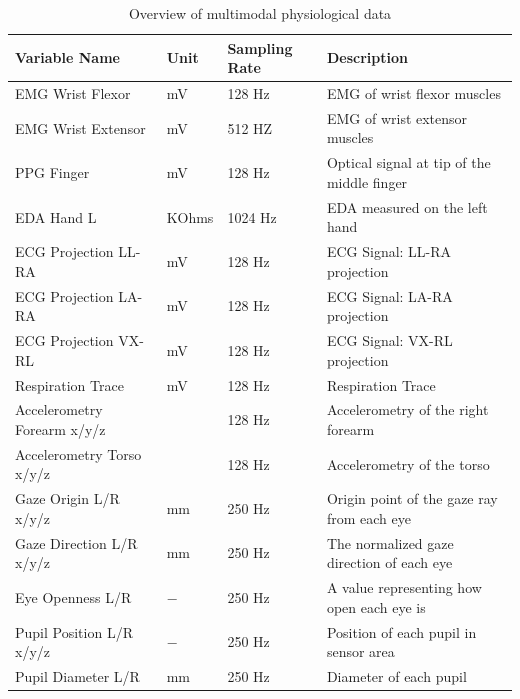 \documentclass[11pt, a4paper]{article}
\begin{document}
\begin{table}[htbp]
	\caption{Overview of multimodal physiological data}
	\label{tab:multimodal}
	\centering
	\small
	\begin{tabular}{lllp{2cm}}
		\toprule                                 	
		Variable Name         &Unit           &Sampling Rate        		&  Description     \\ 
		\midrule
		EMG Wrist Flexor 	&mV  				& 128 Hz         	& EMG of wrist flexor muscles\\
		\midrule
		EMG Wrist Extensor 	&mV				& 512 HZ         & EMG of wrist extensor muscles  \\
		\midrule  			
		PPG Finger 	&mV				&128 Hz     & Optical signal at tip of the middle finger \\
		\midrule
		EDA Hand L &KOhms 				& 1024 Hz          		& EDA measured on the left hand \\
		\midrule
		ECG Projection LL-RA &mV     &128 Hz           		& ECG Signal: LL-RA projection \\
		\midrule
		ECG Projection LA-RA &mV    &128 Hz          		& ECG Signal: LA-RA projection \\
		\midrule
		ECG Projection VX-RL &mV    &128 Hz           		& ECG Signal: VX-RL projection \\
		\midrule
		Respiration Trace &mV    	&128 Hz        		& Respiration Trace \\
		\midrule
		Accelerometry Forearm x/y/z &\text{m/s\textsuperscript{2}}    &128 Hz  & Accelerometry of the right forearm\\
		\midrule
		Accelerometry Torso x/y/z &\text{m/s\textsuperscript{2}}   &128 Hz  & Accelerometry of the torso\\
		\midrule
		Gaze Origin L/R x/y/z &mm		&250 Hz 		& Origin point of the gaze ray from each eye \\
		\midrule
		Gaze Direction L/R x/y/z &mm	&250 Hz		& The normalized gaze direction of each eye \\
		\midrule
		Eye Openness L/R &$-$			&250 Hz  		& A value representing how open each eye is\\
		\midrule
		Pupil Position L/R x/y/z &$-$	&250 Hz  	& Position of each pupil in sensor area\\
		\midrule
		Pupil Diameter L/R  &mm			&250 Hz 		& Diameter of each pupil\\
		\bottomrule	
	\end{tabular}
\end{table}
\end{document}
